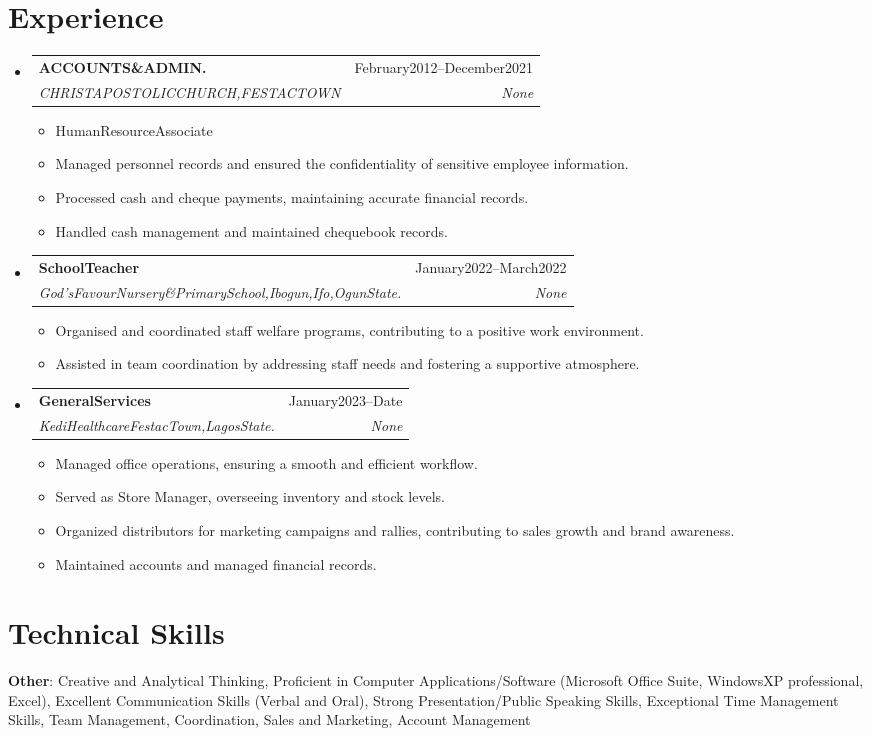 \documentclass[letterpaper,11pt]{article}
\makeatletter
\newcommand{\resumeItem}[1]{
  \item\small{
    {#1 \vspace{-2pt}}
  }
}
\newcommand{\resumeSubheading}[4]{
  \vspace{-2pt}\item
    \begin{tabular*}{0.97\textwidth}[t]{l@{\extracolsep{\fill}}r}
      \textbf{#1} & #2 \\
      \textit{\small#3} & \textit{\small #4} \\
    \end{tabular*}\vspace{-7pt}
}
\newcommand{\resumeSubHeadingListStart}{\begin{itemize}[leftmargin=0.15in, label={}]}
\newcommand{\resumeSubHeadingListEnd}{\end{itemize}}
\newcommand{\resumeItemListStart}{\begin{itemize}}
\newcommand{\resumeItemListEnd}{\end{itemize}\vspace{-5pt}}
\makeatother
\begin{document}
\section{Experience}
  \resumeSubHeadingListStart
    \resumeSubheading
      {ACCOUNTS\&ADMIN.}{February2012--December2021}
      {CHRISTAPOSTOLICCHURCH,FESTACTOWN}{None}
      \resumeItemListStart
        \resumeItem{HumanResourceAssociate}
        \resumeItem{Managed personnel records and ensured the confidentiality of sensitive employee information.}
        \resumeItem{Processed cash and cheque payments, maintaining accurate financial records.}
        \resumeItem{Handled cash management and maintained chequebook records.}
      \resumeItemListEnd
    \resumeSubheading
      {SchoolTeacher}{January2022--March2022}
      {God’sFavourNursery\&PrimarySchool,Ibogun,Ifo,OgunState.}{None}
      \resumeItemListStart
        \resumeItem{Organised and coordinated staff welfare programs, contributing to a positive work environment.}
        \resumeItem{Assisted in team coordination by addressing staff needs and fostering a supportive atmosphere.}
      \resumeItemListEnd
    \resumeSubheading
      {GeneralServices}{January2023--Date}
      {KediHealthcareFestacTown,LagosState.}{None}
      \resumeItemListStart
        \resumeItem{Managed office operations, ensuring a smooth and efficient workflow.}
        \resumeItem{Served as Store Manager, overseeing inventory and stock levels.}
        \resumeItem{Organized distributors for marketing campaigns and rallies, contributing to sales growth and brand awareness.}
        \resumeItem{Maintained accounts and managed financial records.}
      \resumeItemListEnd
  \resumeSubHeadingListEnd

\section{Technical Skills}
 \begin{itemize}[leftmargin=0.15in, label={}]
    \small{\item{
     \textbf{Other}: Creative and Analytical Thinking, Proficient in Computer Applications/Software (Microsoft Office Suite, WindowsXP professional, Excel), Excellent Communication Skills (Verbal and Oral), Strong Presentation/Public Speaking Skills, Exceptional Time Management Skills, Team Management, Coordination, Sales and Marketing, Account Management
    }}
 \end{itemize}

\end{document}
